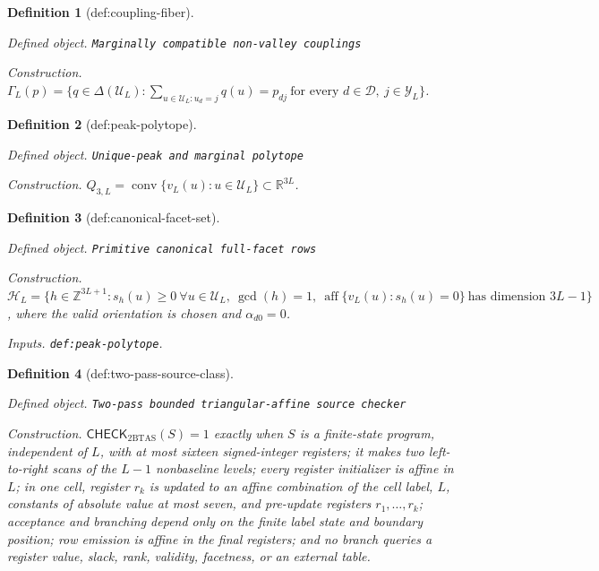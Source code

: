 \documentclass{article}
\newtheorem{definition}{Definition}
\begin{document}
\begin{definition}[def:coupling-fiber]\label{def:coupling-fiber}
\par\smallskip\noindent\emph{Defined object.} \texttt{Marginally compatible non-\allowbreak{}valley couplings}
\par\smallskip\noindent\emph{Construction.} \(\Gamma_L(p)=\{q\in\Delta(\mathcal U_L):\sum_{u\in\mathcal U_L:u_d=j}q(u)=p_{dj}\ \text{for every }d\in\mathcal D,\ j\in\mathcal Y_L\}\).
\end{definition}

\begin{definition}[def:peak-polytope]\label{def:peak-polytope}
\par\smallskip\noindent\emph{Defined object.} \texttt{Unique-\allowbreak{}peak and marginal polytope}
\par\smallskip\noindent\emph{Construction.} \(Q_{3,L}=\operatorname{conv}\{v_L(u):u\in\mathcal U_L\}\subset\mathbb R^{3L}\).
\end{definition}

\begin{definition}[def:canonical-facet-set]\label{def:canonical-facet-set}
\par\smallskip\noindent\emph{Defined object.} \texttt{Primitive canonical full-\allowbreak{}facet rows}
\par\smallskip\noindent\emph{Construction.} \(\mathcal H_L=\{h\in\mathbb Z^{3L+1}:s_h(u)\ge0\ \forall u\in\mathcal U_L,\ \gcd(h)=1,\ \operatorname{aff}\{v_L(u):s_h(u)=0\}\ \text{has dimension }3L-1\}\), where the valid orientation is chosen and \(\alpha_{d0}=0\).
\par\smallskip\noindent\emph{Inputs.} \texttt{def:\allowbreak{}peak-\allowbreak{}polytope}.
\end{definition}

\begin{definition}[def:two-pass-source-class]\label{def:two-pass-source-class}
\par\smallskip\noindent\emph{Defined object.} \texttt{Two-\allowbreak{}pass bounded triangular-\allowbreak{}affine source checker}
\par\smallskip\noindent\emph{Construction.} \(\mathsf{CHECK}_{2\mathrm{BTAS}}(S)=1\) exactly when \(S\) is a finite-state program, independent of \(L\), with at most sixteen signed-integer registers; it makes two left-to-right scans of the \(L-1\) nonbaseline levels; every register initializer is affine in \(L\); in one cell, register \(r_k\) is updated to an affine combination of the cell label, \(L\), constants of absolute value at most seven, and pre-update registers \(r_1,\ldots,r_k\); acceptance and branching depend only on the finite label state and boundary position; row emission is affine in the final registers; and no branch queries a register value, slack, rank, validity, facetness, or an external table.
\end{definition}
\end{document}
